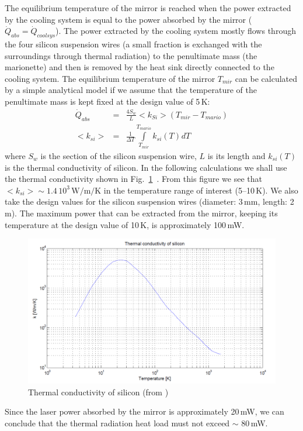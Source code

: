 The equilibrium temperature of the mirror is reached when the power extracted by the cooling system is equal to the power absorbed by the mirror ($\dot{Q}_{abs}=\dot{Q}_{coolsys}$). The power extracted by the cooling system mostly flows through the four silicon suspension wires (a small fraction is exchanged with the surroundings through thermal radiation) to the penultimate mass (the marionette) and then is removed by the heat sink directly connected to the cooling system.
The equilibrium temperature of the mirror $T_{mir}$ can be calculated by a simple analytical model if we assume that the temperature of the penultimate mass is kept fixed at the design value of 5\,K:
\begin{eqnarray}
\dot Q_{abs} & =  & \frac{4  S_w}{L}<k_{Si}>\left (T_{mir} - T_{mario}\right) \\
 <k_{si}> & = & \frac{1} {{\Delta T}}\int\limits_{T_{mir}}^{T_{mario}} {{k_{si}}(T)_{}^{}dT}
\end{eqnarray}
where $S_w$ is the section of the silicon suspension wire, $L$ is its length and $k_{si}(T)$ is the thermal conductivity of silicon. In the following calculations we shall use the thermal conductivity shown in Fig.~\ref{fig:k-silicon-comsol}~\cite{k-silicon-comsol}. From this figure we see that $<k_{si}>\sim 1.4\, 10^3 \, \mathrm{W/m/K}$  in the temperature range of interest (5--10\,K). We also take the design values for the silicon suspension wires (diameter: 3\,mm, length: 2\,m). The maximum power that can be extracted from the mirror, keeping its temperature at the design value of 10\,K, is approximately 100\,mW. 
\begin{figure}[htbp]
	\begin{center}
		 \includegraphics[width=12cm]{Sec_SiteInfra/Cryotraps/k-silicon-comsol.pdf}
			\caption{Thermal conductivity of silicon  (from \cite{k-silicon-comsol})}		
			\label{fig:k-silicon-comsol}
	\end{center}
\end{figure}
Since the laser power absorbed by the mirror is approximately 20\,mW, we can conclude that the thermal radiation heat load must not exceed $\sim$ 80\,mW.

